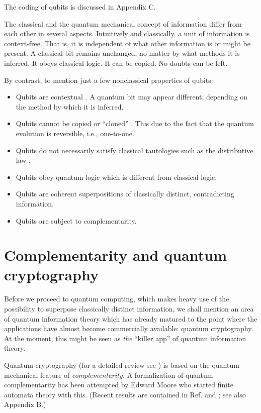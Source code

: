 \documentclass [11pt]{llncs}
\begin{document}
The coding of qubits is discussed in Appendix C.


The classical and the quantum mechanical
concept of information differ from each other in several aspects.
Intuitively and classically, a unit of information is context-free.
That is, it is independent of what other information is or
might be present. A classical bit remains unchanged, no matter by what
methods it is inferred.
It obeys classical logic.
It can be copied. No doubts can be left.

By contrast, to mention just a few nonclassical properties of qubits:
\begin{itemize}
\item
Qubits are contextual \cite{kochen1}.
A quantum bit may appear different,
depending on the method by which it is inferred.
\item
Qubits cannot be copied or ``cloned''
\cite{wo-zu,dieks,mandel:83,mil-hard,glauber,caves}.
This due to the fact that the quantum evolution is reversible, i.e., one-to-one.
\item
Qubits do not necessarily satisfy
classical tautologies such as the distributive law \cite{kochen2,kochen3}.
\item
Qubits obey quantum logic \cite{birkhoff-36} which is different from classical logic.
\item
Qubits are coherent superpositions of
classically distinct, contradicting information.
\item
Qubits are subject to complementarity.
\end{itemize}


\section{Complementarity and quantum cryptography}

Before we proceed to quantum computing,
which makes heavy use of the possibility to superpose classically distinct information,
we shall mention an area of quantum information theory which
has already matured to the point where the applications have
almost become commercially available:
quantum cryptography.
At the moment, this might be seen as
{\em the} ``killer app'' of quantum information theory.

Quantum cryptography
(for a detailed review see \cite{benn-92})
is based on the quantum mechanical feature of
{\em complementarity.}
A formalization of quantum complementarity has been attempted by Edward Moore
\cite{e-f-moore} who started finite automata theory with this.
(Recent results are contained in Ref. \cite{cal-sv-yu} and \cite[chapter 10]{svozil-ql}; see also Appendix B.)
\end{document}
